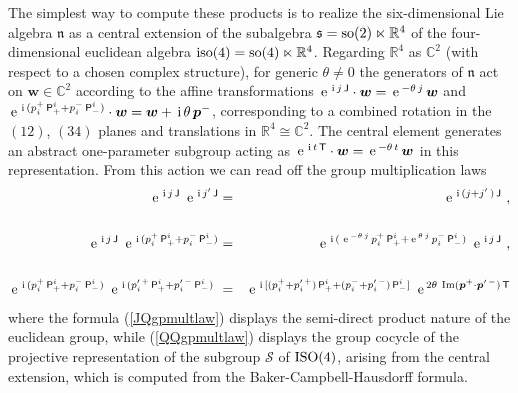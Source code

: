 \documentclass[11pt,a4paper]{article}
\newcommand{\mbf}[1]{{\boldsymbol {#1} }}
\def\ii{{\,{\rm i}\,}}
\def\P{{\sf P}}
\def\T{{\sf T}}
\def\J{{\sf J}}
\def\mw{{\mbf w}}
\def\mbp{{\mbf p}}
\def\mfn{{\mathfrak n}}
\def\mfs{{\mathfrak s}}
\newcommand{\complex}{{\mathbb C}} %
\newcommand{\real}{{\mathbb R}} %
\def\nn{\nonumber}
\def\e{{\,\rm e}\,}
\def\bea{\begin{eqnarray}}
\def\eea{\end{eqnarray}}
\begin{document}
The simplest way to compute these products is to realize the
six-dimensional Lie algebra $\mfn$ as a central
extension of the subalgebra $\mfs={\rm so}(2)\ltimes\real^4$ of the
four-dimensional euclidean algebra
${\rm iso}(4)={\rm so}(4)\ltimes\real^4$. Regarding $\real^4$ as
$\complex^2$ (with respect to a chosen complex structure), for generic
$\theta\neq0$ the generators of $\mfn$ act on $\mw\in\complex^2$
according to the affine transformations $\e^{\ii
  j\,\J}\cdot\mw=\e^{-\theta\,j}\,\mw$ and
$\e^{\ii(p_i^+\,\P^i_++p_i^-\,\P^i_-)}\cdot\mw=\mw+\ii\theta\,\mbp^-$,
corresponding to a combined rotation in the $(12)$, $(34)$ planes and
translations in $\real^4\cong\complex^2$. The central element
generates an abstract one-parameter subgroup acting as $\e^{\ii
  t\,\T}\cdot\mw=\e^{-\theta\,t}\,\mw$ in this representation. From
this action we can read off the group multiplication laws
\bea
\e^{\ii j\,\J}~\e^{\ii j'\,\J}&=&\e^{\ii(j+j'\,)\,\J} \ ,
\label{JJgpmultlaw}\\
{~~~~}^{~~}_{~~}\nn\\\e^{\ii
  j\,\J}~\e^{\ii(p_i^+\,\P^i_++p_i^-\,\P^i_-)}
&=&\e^{\ii(\,\e^{-\theta\,j}\,p_i^+\,\P^i_+
+\e^{\theta\,j}\,p_i^-\,\P^i_-)}~\e^{\ii j\,\J} \ ,
\label{JQgpmultlaw}\\
{~~~~}^{~~}_{~~}\nn\\\e^{\ii(p_i^+\,\P^i_++p_i^-\,\P^i_-)}~
\e^{\ii(p_i^{\prime\,+}\,\P^i_++p_i^{\prime\,-}\,\P^i_-)}~
&=&\e^{\ii[(p_i^++p_i^{\prime\,+})\,\P^i_+
+(p_i^-+p_i^{\prime\,-})\,\P^i_-]}~\e^{2\theta~{\rm Im}(
\mbp^+\cdot\mbp^{\prime\,-})\,\T}
\label{QQgpmultlaw}\eea
where the formula (\ref{JQgpmultlaw}) displays the semi-direct product
nature of the euclidean group, while (\ref{QQgpmultlaw}) displays the
group cocycle of the projective representation of the subgroup
$\mathcal S$ of ${\rm ISO}(4)$, arising from the central extension,
which is computed from the Baker-Campbell-Hausdorff formula.
\end{document}
